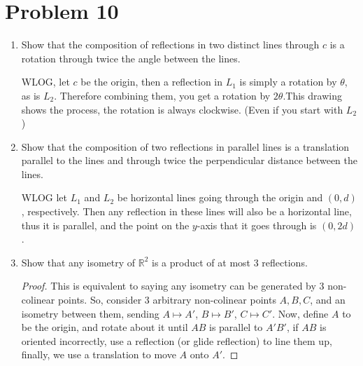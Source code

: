 \documentclass[a4paper,12pt]{extarticle}
\theoremstyle{definition}
\newcommand{\R}{\mathbb{R}} \newcommand{\Q}{\mathbb{Q}} \newcommand{\Z}{\mathbb{Z}} \newcommand{\N}{\mathbb{N}} \newcommand{\myskip}{\par\null\par} \renewcommand\qedsymbol{QED} \renewcommand{\leq}{\leqslant}\renewcommand{\geq}{\geqslant}
\begin{document}
            \section*{Problem 10}
            \begin{enumerate}[label=(\alph*)]
                \item Show that the composition of reflections in two distinct lines through $c$ is a rotation through twice the angle between the lines.\myskip WLOG, let $c$ be the origin, then a reflection in $L_1$ is simply a rotation by $\theta$, as is $L_2$. Therefore combining them, you get a rotation by $2\theta$.\newline {}\newline This drawing shows the process, the rotation is always clockwise. (Even if you start with $L_2$)
                \item Show that the composition of two reflections in parallel lines is a translation parallel to the lines and through twice the perpendicular distance between the lines.\myskip WLOG let $L_1$ and $L_2$ be horizontal lines going through the origin and $(0,d)$, respectively. Then any reflection in these lines will also be a horizontal line, thus it is parallel, and the point on the $y$-axis that it goes through is $(0,2d)$.
                \item Show that any isometry of $\R^2$ is a product of at most 3 reflections.\begin{proof}
                This is equivalent to saying any isometry can be generated by 3 non-colinear points. So, consider 3 arbitrary non-colinear points $A,B,C$, and an isometry between them, sending $A\mapsto A'$, $B\mapsto B'$, $C\mapsto C'$. Now, define $A$ to be the origin, and rotate about it until $AB$ is parallel to $A'B'$, if $AB$ is oriented incorrectly, use a reflection (or glide reflection) to line them up, finally, we use a translation to move $A$ onto $A'$.

\end{proof}
\end{enumerate}
\end{document}
